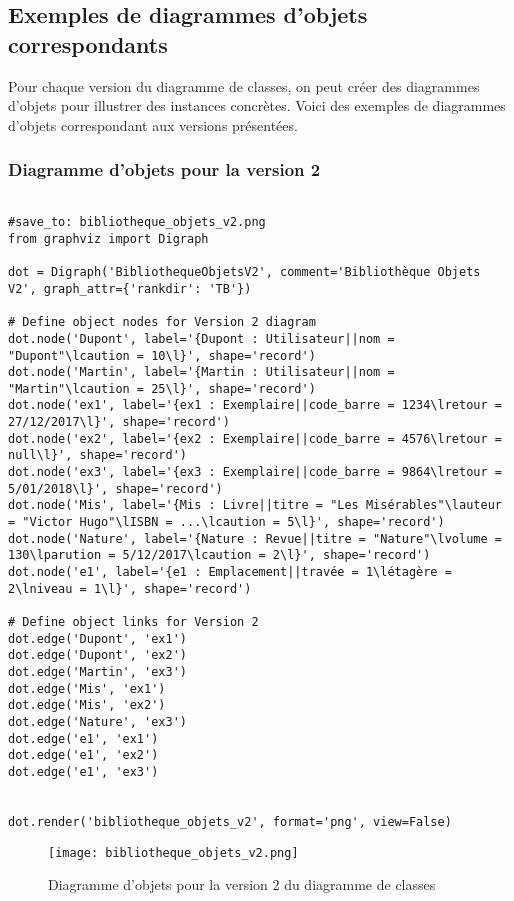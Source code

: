 \documentclass{article}
\begin{document}
\subsection{Exemples de diagrammes d'objets correspondants}

Pour chaque version du diagramme de classes, on peut créer des diagrammes d'objets pour illustrer des instances concrètes.  Voici des exemples de diagrammes d'objets correspondant aux versions présentées.

\subsubsection{Diagramme d'objets pour la version 2}

\begin{verbatim}

#save_to: bibliotheque_objets_v2.png
from graphviz import Digraph

dot = Digraph('BibliothequeObjetsV2', comment='Bibliothèque Objets V2', graph_attr={'rankdir': 'TB'})

# Define object nodes for Version 2 diagram
dot.node('Dupont', label='{Dupont : Utilisateur||nom = "Dupont"\lcaution = 10\l}', shape='record')
dot.node('Martin', label='{Martin : Utilisateur||nom = "Martin"\lcaution = 25\l}', shape='record')
dot.node('ex1', label='{ex1 : Exemplaire||code_barre = 1234\lretour = 27/12/2017\l}', shape='record')
dot.node('ex2', label='{ex2 : Exemplaire||code_barre = 4576\lretour = null\l}', shape='record')
dot.node('ex3', label='{ex3 : Exemplaire||code_barre = 9864\lretour = 5/01/2018\l}', shape='record')
dot.node('Mis', label='{Mis : Livre||titre = "Les Misérables"\lauteur = "Victor Hugo"\lISBN = ...\lcaution = 5\l}', shape='record')
dot.node('Nature', label='{Nature : Revue||titre = "Nature"\lvolume = 130\lparution = 5/12/2017\lcaution = 2\l}', shape='record')
dot.node('e1', label='{e1 : Emplacement||travée = 1\létagère = 2\lniveau = 1\l}', shape='record')

# Define object links for Version 2
dot.edge('Dupont', 'ex1')
dot.edge('Dupont', 'ex2')
dot.edge('Martin', 'ex3')
dot.edge('Mis', 'ex1')
dot.edge('Mis', 'ex2')
dot.edge('Nature', 'ex3')
dot.edge('e1', 'ex1')
dot.edge('e1', 'ex2')
dot.edge('e1', 'ex3')


dot.render('bibliotheque_objets_v2', format='png', view=False)
\end{verbatim}

\begin{figure}[H]
    \centering
    \texttt{[image: bibliotheque\_objets\_v2.png]}
    \caption{Diagramme d'objets pour la version 2 du diagramme de classes}
    \label{fig:bibliotheque_objets_v2}
\end{figure}
\end{document}
